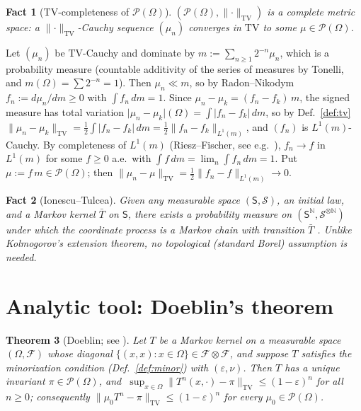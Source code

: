 \documentclass[11pt]{article}
\makeatletter
\theoremstyle{definitionbreak}
\theoremstyle{plainbreak}
\newtheorem{theorem}{Theorem}[section]
\newtheorem{fact}[theorem]{Fact}
\theoremstyle{remarkbreak}
\renewenvironment{proof}[1][\proofname]{\par
  \pushQED{\qed}\normalfont
  \topsep6\p@\@plus6\p@\relax
  \trivlist
  \item[\hskip\labelsep\itshape #1\@addpunct{.}]\mbox{}\par\nobreak\ignorespaces
}{\popQED\endtrivlist\@endpefalse}
\newcommand{\N}{\mathbb{N}}
\newcommand{\cF}{\mathcal{F}}
\newcommand{\cP}{\mathcal{P}}
\newcommand{\Om}{\Omega}
\newcommand{\TV}{\mathrm{TV}}
\newcommand{\norm}[1]{\lVert #1 \rVert}
\newcommand{\abs}[1]{\lvert #1 \rvert}
\makeatother
\begin{document}
\begin{fact}[TV-completeness of $\cP(\Om)$]
\label{fact:complete}
$(\cP(\Om),\norm{\cdot}_\TV)$ is a complete metric space: a $\norm{\cdot}_\TV$-Cauchy sequence
$(\mu_n)$ converges in $\TV$ to some $\mu\in\cP(\Om)$.
\end{fact}
\begin{proof}
Let $(\mu_n)$ be $\TV$-Cauchy and dominate by $m:=\sum_{n\ge1}2^{-n}\mu_n$, which is a probability
measure (countable additivity of the series of measures by Tonelli, and $m(\Om)=\sum2^{-n}=1$). Then
$\mu_n\ll m$, so by Radon--Nikodym $f_n:=d\mu_n/dm\ge0$ with $\int f_n\,dm=1$. Since
$\mu_n-\mu_k=(f_n-f_k)\,m$, the signed measure has total variation
$\abs{\mu_n-\mu_k}(\Om)=\int\abs{f_n-f_k}\,dm$, so by Def.~\ref{def:tv}
$\norm{\mu_n-\mu_k}_\TV=\tfrac12\int\abs{f_n-f_k}\,dm=\tfrac12\norm{f_n-f_k}_{L^1(m)}$, and $(f_n)$ is
$L^1(m)$-Cauchy. By completeness of $L^1(m)$ (Riesz--Fischer, see e.g.\ \cite{Folland}), $f_n\to f$
in $L^1(m)$ for some $f\ge0$ a.e.\ with $\int f\,dm=\lim_n\int f_n\,dm=1$. Put $\mu:=f\,m\in\cP(\Om)$;
then $\norm{\mu_n-\mu}_\TV=\tfrac12\norm{f_n-f}_{L^1(m)}\to0$.
\end{proof}

\begin{fact}[Ionescu--Tulcea]
\label{fact:it}
Given \emph{any} measurable space $(\mathsf S,\mathcal S)$, an initial law, and a Markov kernel
$\bar T$ on $\mathsf S$, there exists a probability measure on $(\mathsf S^{\N},\mathcal S^{\otimes\N})$
under which the coordinate process is a Markov chain with transition $\bar T$
\cite[Ch.~6]{Kallenberg}. Unlike Kolmogorov's extension theorem, no topological (standard Borel)
assumption is needed.
\end{fact}

\section{Analytic tool: Doeblin's theorem}
\label{sec:tool}

\begin{theorem}[Doeblin; see {\cite[Ch.~16]{MeynTweedie}}]
\label{thm:doeblin}
Let $T$ be a Markov kernel on a measurable space $(\Om,\cF)$ whose diagonal
$\{(x,x):x\in\Om\}\in\cF\otimes\cF$, and suppose $T$ satisfies the minorization condition
(Def.~\ref{def:minor}) with $(\varepsilon,\nu)$. Then $T$ has a unique invariant
$\pi\in\cP(\Om)$, and $\ \sup_{x\in\Om}\norm{T^n(x,\cdot)-\pi}_\TV\le(1-\varepsilon)^n$ for all
$n\ge0$; consequently $\norm{\mu_0T^n-\pi}_\TV\le(1-\varepsilon)^n$ for every $\mu_0\in\cP(\Om)$.
\end{theorem}
\end{document}
